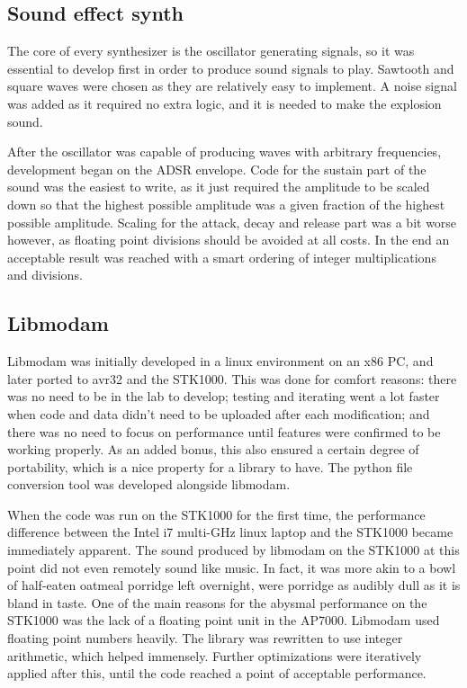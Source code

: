 
\subsection{Sound effect synth}

The core of every synthesizer is the oscillator generating signals, so it was essential to develop first in order to produce sound signals to play.
Sawtooth and square waves were chosen as they are relatively easy to implement.
A noise signal was added as it required no extra logic, and it is needed to make the explosion sound.

After the oscillator was capable of producing waves with arbitrary frequencies, development began on the ADSR envelope.
Code for the sustain part of the sound was the easiest to write, as it just required the amplitude to be scaled down so that the highest possible amplitude was a given fraction of the highest possible amplitude.
Scaling for the attack, decay and release part was a bit worse however, as floating point divisions should be avoided at all costs.
In the end an acceptable result was reached with a smart ordering of integer multiplications and divisions.

\subsection{Libmodam}

Libmodam was initially developed in a linux environment on an x86 PC, and later ported to avr32 and the STK1000.
This was done for comfort reasons: there was no need to be in the lab to develop; testing and iterating went a lot faster when code and data didn't need to be uploaded after each modification; and there was no need to focus on performance until features were confirmed to be working properly.
As an added bonus, this also ensured a certain degree of portability, which is a nice property for a library to have.
The python file conversion tool was developed alongside libmodam.

When the code was run on the STK1000 for the first time, the performance difference between the Intel i7 multi-GHz linux laptop and the STK1000 became immediately apparent.
The sound produced by libmodam on the STK1000 at this point did not even remotely sound like music.
In fact, it was more akin to a bowl of half-eaten oatmeal porridge left overnight, were porridge as audibly dull as it is bland in taste.
One of the main reasons for the abysmal performance on the STK1000 was the lack of a floating point unit in the AP7000.
Libmodam used floating point numbers heavily.
The library was rewritten to use integer arithmetic, which helped immensely.
Further optimizations were iteratively applied after this, until the code reached a point of acceptable performance.

